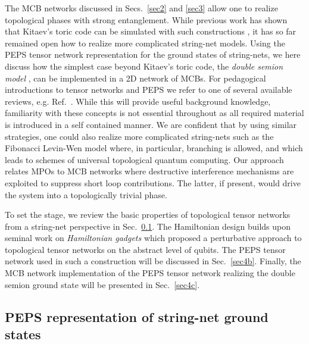 \documentclass[twocolumn,floats,prx,showpacs]{revtex4-1}
\begin{document}
The MCB networks discussed in Secs.~\ref{sec2} and \ref{sec3}
allow one to realize topological phases with strong entanglement. 
While previous work has shown that Kitaev's toric code can be 
simulated with such constructions \cite{PhysRevLett.116.050501,PhysRevB.94.174514,PhysRevLett.108.260504,PhysRevX.6.031016}, 
it has so far remained open how 
to realize more complicated string-net models.  Using the PEPS tensor network representation for the ground states of string-nets, we 
here discuss how the simplest case beyond Kitaev's toric code,  the \emph{double semion model} \cite{Levin2005,Buerschaper2014,Gu2009}, can be implemented in a 2D network of MCBs.  For pedagogical introductions to tensor networks and PEPS we refer to one of several available reviews, e.g. Ref.~\cite{Orus-AnnPhys-2014}. While this will provide useful background knowledge, familiarity with these concepts is not essential throughout as all required material is introduced in a self contained manner.
We are confident that by using similar strategies, one could also 
realize more complicated string-nets such as the Fibonacci Levin-Wen model \cite{Levin2005} where, in particular, branching is allowed,
and which leads to schemes of  universal topological quantum computing. 
Our approach relates MPOs to MCB networks where destructive interference mechanisms are exploited to suppress short loop contributions.  The latter, if present, would drive the system into a topologically trivial phase.




To set the stage, we review the basic properties of topological tensor networks from a string-net perspective in Sec.~\ref{sec4a}.  
The Hamiltonian design builds upon seminal work on \emph{Hamiltonian gadgets} \cite{Brell2014PEPS} which 
proposed a perturbative approach to topological tensor networks on the abstract level of qubits. The PEPS tensor network used in such a construction will be discussed in Sec.~\ref{sec4b}. Finally, the MCB network implementation of the PEPS tensor network realizing 
the double semion ground state will be presented in Sec.~\ref{sec4c}.

\subsection{PEPS representation of string-net ground states}\label{sec4a}
\end{document}
